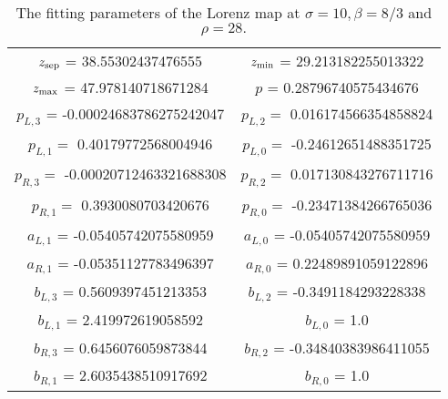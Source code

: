 \begin{table}[H]
    \centering
    \begin{tabular}{|c|c|}
    \hline 
         $z_{\rm sep}$ = 38.55302437476555 &
         $z_{\rm min}$ =  29.213182255013322 \\ 
         $z_{\rm max}$ =  47.978140718671284 & 
         $p$ = 0.28796740575434676   \\
         $p_{L,3}$ = -0.00024683786275242047 & $p_{L,2} = $ 
         0.016174566354858824 \\
         $p_{L,1} = $ 0.40179772568004946 & 
         $p_{L, 0}  = $ -0.24612651488351725 \\
         $p_{R,3} = $ -0.00020712463321688308 & 
         $p_{R,2} = $ 0.017130843276711716 \\
         $p_{R, 1} = $ 0.3930080703420676 & 
         $p_{R, 0} = $ -0.23471384266765036 \\
         $a_{L,1}$ = -0.05405742075580959 & $a_{L,0}$ = -0.05405742075580959 \\
         $a_{R,1}$ = -0.05351127783496397 & $a_{R,0}$ = 0.22489891059122896 \\
         $b_{L,3}$ = 0.5609397451213353 & $b_{L,2}$ = -0.3491184293228338 \\  $b_{L,1}$ = 2.419972619058592 & $b_{L,0}$ = 1.0 \\
         $b_{R,3}$ = 0.6456076059873844 & $b_{R,2}$ = -0.34840383986411055 \\ $b_{R,1}$ = 2.6035438510917692 &  $b_{R,0}$ = 1.0 \\
         \hline
    \end{tabular}
    \caption{The fitting parameters of the Lorenz map at $\sigma = 10, \beta = 8/3$ and $\rho = 28.$}
    \label{tab:my_label}
\end{table}


